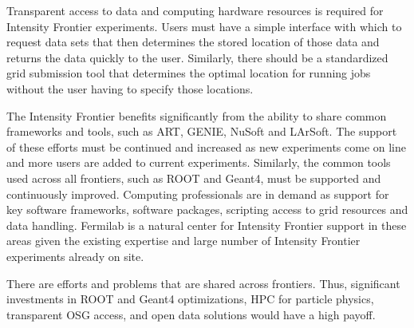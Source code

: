 Transparent access to data and computing hardware resources is required for Intensity Frontier
experiments.   Users must have a simple interface with which to request data
sets that then determines the stored location of those data and returns the
data quickly to the user.  Similarly, there should be a standardized grid
submission tool that determines the optimal location for running jobs without
the user having to specify those locations.

The Intensity Frontier benefits significantly from the ability to share common frameworks and
tools, such as ART, GENIE, NuSoft and LArSoft.  The support of these efforts
must be continued and increased as new experiments come on line and more users
are added to current experiments.  Similarly, the common tools used across all
frontiers, such as ROOT and Geant4, must be supported and continuously
improved. Computing professionals are in demand as support for key software
frameworks, software packages, scripting access to grid resources and data
handling. Fermilab is a natural center for Intensity Frontier support in these areas given the
existing expertise and large number of Intensity Frontier experiments already on site.

There are efforts and problems that are shared across frontiers.  Thus, significant
investments in ROOT and Geant4 optimizations, HPC for particle physics, 
transparent OSG access, and open data solutions would have a high payoff.
